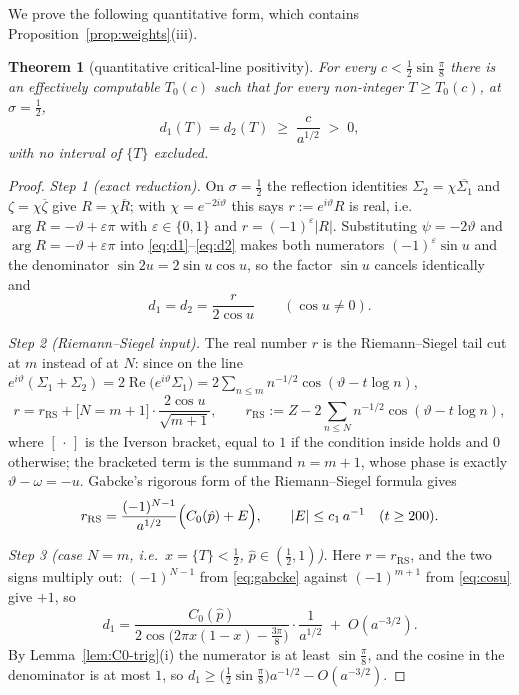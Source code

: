 \documentclass[11pt]{article}
\newtheorem{theorem}{Theorem}[section]
\theoremstyle{definition}
\begin{document}
We prove the following quantitative form, which contains
Proposition~\ref{prop:weights}(iii).

\begin{theorem}[quantitative critical-line positivity]\label{thm:line-bound}
For every $c<\tfrac12\sin\tfrac\pi8$ there is an effectively computable
$T_0(c)$ such that for every non-integer $T\geq T_0(c)$, at
$\sigma=\tfrac12$,
\[
d_1(T)=d_2(T)\;\geq\;\frac{c}{a^{1/2}}\;>\;0,
\]
with no interval of $\{T\}$ excluded.
\end{theorem}

\begin{proof}
\emph{Step 1 (exact reduction).} On $\sigma=\tfrac12$ the reflection
identities $\Sigma_2=\chi\overline{\Sigma_1}$ and $\zeta=\chi\overline\zeta$
give $R=\chi\overline R$; with $\chi=e^{-2i\vartheta}$ this says
$r:=e^{i\vartheta}R$ is real, i.e.\ $\arg R=-\vartheta+\varepsilon\pi$ with
$\varepsilon\in\{0,1\}$ and $r=(-1)^{\varepsilon}|R|$. Substituting
$\psi=-2\vartheta$ and $\arg R=-\vartheta+\varepsilon\pi$ into
\eqref{eq:d1}--\eqref{eq:d2} makes both numerators
$(-1)^{\varepsilon}\sin u$ and the denominator $\sin2u=2\sin u\cos u$, so
the factor $\sin u$ cancels identically and
\begin{equation}\label{eq:exact-line}
d_1=d_2=\frac{r}{2\cos u}
\qquad(\cos u\neq0).
\end{equation}

\emph{Step 2 (Riemann--Siegel input).} The real number $r$ is the
Riemann--Siegel tail cut at $m$ instead of at $N$: since on the line
$e^{i\vartheta}(\Sigma_1+\Sigma_2)=2\operatorname{Re}\bigl(e^{i\vartheta}
\Sigma_1\bigr)=2\sum_{n\leq m}n^{-1/2}\cos(\vartheta-t\log n)$,
\begin{equation}\label{eq:r-two-cases}
r=r_{\mathrm{RS}}+\bigl[N=m+1\bigr]\cdot\frac{2\cos u}{\sqrt{m+1}},
\qquad
r_{\mathrm{RS}}:=Z-2\!\!\sum_{n\leq N}\!n^{-1/2}\cos(\vartheta-t\log n),
\end{equation}
where $[\,\cdot\,]$ is the Iverson bracket, equal to $1$ if the condition
inside holds and $0$ otherwise; the bracketed term is the summand $n=m+1$, whose phase is exactly
$\vartheta-\omega=-u$. Gabcke's rigorous form of the Riemann--Siegel
formula \cite{Gabcke1979} gives
\begin{equation}\label{eq:gabcke}
r_{\mathrm{RS}}=\frac{(-1)^{N-1}}{a^{1/2}}\Bigl(C_0(\hat p)+E\Bigr),
\qquad |E|\leq c_1\,a^{-1}\quad(t\geq200).
\end{equation}

\emph{Step 3 (case $N=m$, i.e.\ $x=\{T\}<\tfrac12$,
$\hat p\in(\tfrac12,1)$).} Here $r=r_{\mathrm{RS}}$, and the two signs
multiply out: $(-1)^{N-1}$ from \eqref{eq:gabcke} against $(-1)^{m+1}$ from
\eqref{eq:cosu} give $+1$, so
\[
d_1=\frac{C_0(\hat p)}
{2\cos\bigl(2\pi x(1-x)-\tfrac{3\pi}8\bigr)}\cdot\frac{1}{a^{1/2}}
\;+\;O(a^{-3/2}).
\]
By Lemma~\ref{lem:C0-trig}(i) the numerator is at least $\sin\tfrac\pi8$,
and the cosine in the denominator is at most $1$, so
$d_1\geq\bigl(\tfrac12\sin\tfrac\pi8\bigr)a^{-1/2}-O(a^{-3/2})$.


\end{proof}
\end{document}
